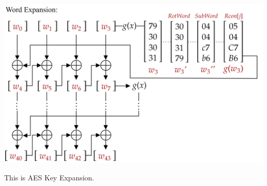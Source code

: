 \hspace{-2em}
\includegraphics[width=1\textwidth]{Sections/sec/enc/aes/recap2.png}

\vspace{1em}
\noindent
This is AES Key Expansion.
